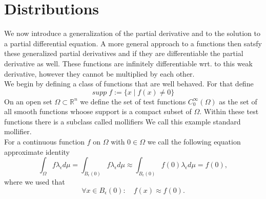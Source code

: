 \documentclass[A4,12pt,twoside]{book}
\begin{document}
\section{Distributions}
We now introduce a generalization of the partial derivative and to the solution to a partial differential equation. A more general approach to a functions then satsfy these generalized partial derivatives and if they are differentiable the partial derivative as well. These functions are infinitely differentiable wrt. to this weak derivative, however they cannot be multiplied by each other. \\
We begin by defining a class of functions that are well behaved. For that define 
\[
supp \; f := \{ x \mid f(x)\neq 0\}
\]
On an open set $\Omega \subset \mathbb{R}^n$ we define the set of test functions $C_0^\infty (\Omega)$ as the set of all smooth functions whoose support is a compact subset of $\Omega$. Within these test functions there is a subclass called mollifiers 
We call this example standard mollifier. \\
For a continuous function $f$ on $\Omega$ with $0 \in \Omega$ we call the following equation approximate identity
\[
\int_\Omega f \lambda_\epsilon d\mu = \int_{B_\epsilon (0)} f \lambda_\epsilon d\mu \approx \int_{B_\epsilon (0)} f(0) \lambda_\epsilon d\mu = f(0),
\]
where we used that
\[
\forall x \in B_\epsilon(0): \quad f(x) \approx f(0).
\]
\end{document}
